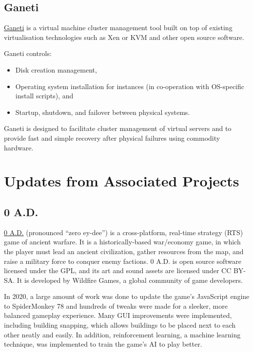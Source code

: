 \documentclass[a4paper]{report}
\begin{document}
\subsection{Ganeti}

\href{https://www.ganeti.org/}{Ganeti} is a virtual machine cluster management tool built on top of existing virtualisation technologies such as Xen or KVM and other open source software.

Ganeti controls:

\begin{itemize}

\item Disk creation management,
\item Operating system installation for instances (in co-operation with OS-specific install scripts), and
\item Startup, shutdown, and failover between physical systems.

\end{itemize}

Ganeti is designed to facilitate cluster management of virtual servers and to provide fast and simple recovery after physical failures using commodity hardware.

\section{Updates from Associated Projects}

\subsection{0 A.D.}

\href{https://play0ad.com/}{0 A.D.} (pronounced ``zero ey-dee'') is a cross-platform, real-time strategy (RTS) game of ancient warfare. It is a historically-based war/economy game, in which the player must lead an ancient civilization, gather resources from the map, and raise a military force to conquer enemy factions. 0 A.D.  is open source software licensed under the GPL, and its art and sound assets are licensed under CC BY-SA. It is developed by Wildfire Games, a global community of game developers.

In 2020, a large amount of work was done to update the game's JavaScript engine to SpiderMonkey 78 and hundreds of tweaks were made for a sleeker, more balanced gameplay experience. Many GUI improvements were implemented, including building snapping, which allows buildings to be placed next to each other neatly and easily. In addition, reinforcement learning, a machine learning technique, was implemented to train the game's AI to play better.
\end{document}
